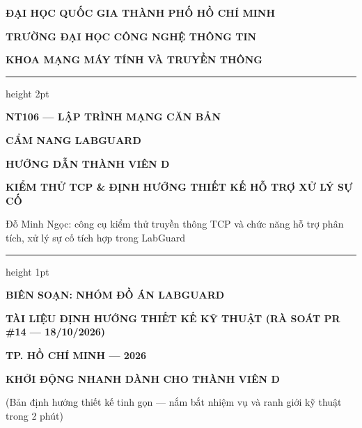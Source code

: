 \documentclass[12pt,a4paper]{article}
\begin{document}
\begin{titlepage}
  \centering
  \vspace*{-10mm}
  {\bfseries\large ĐẠI HỌC QUỐC GIA THÀNH PHỐ HỒ CHÍ MINH\par}
  {\bfseries\large TRƯỜNG ĐẠI HỌC CÔNG NGHỆ THÔNG TIN\par}
  {\bfseries\large KHOA MẠNG MÁY TÍNH VÀ TRUYỀN THÔNG\par}
  \vspace{15mm}
  {\color{lgDeepBlue}\hrule height 2pt}
  \vspace{12mm}
  {\bfseries\large NT106 — LẬP TRÌNH MẠNG CĂN BẢN\par}
  \vspace{12mm}
  {\bfseries\huge\color{lgDeepBlue} CẨM NANG LABGUARD\par}
  \vspace{5mm}
  {\bfseries\Huge\color{lgDeepBlue} HƯỚNG DẪN THÀNH VIÊN D\par}
  \vspace{8mm}
  {\bfseries\Large KIỂM THỬ TCP \& ĐỊNH HƯỚNG THIẾT KẾ HỖ TRỢ XỬ LÝ SỰ CỐ\par}
  \vspace{4mm}
  {\large Đỗ Minh Ngọc: công cụ kiểm thử truyền thông TCP và chức năng hỗ trợ phân tích, xử lý sự cố tích hợp trong LabGuard\par}
  \vspace{12mm}
  {\color{lgTeal}\hrule height 1pt}
  \vspace{25mm}
  {\large\textbf{BIÊN SOẠN: NHÓM ĐỒ ÁN LABGUARD}\par}
  \vspace{6mm}
  {\large\textbf{TÀI LIỆU ĐỊNH HƯỚNG THIẾT KẾ KỸ THUẬT (RÀ SOÁT PR \#14 — 18/10/2026)}\par}
  \vfill
  {\bfseries\color{lgSlate} TP. HỒ CHÍ MINH — 2026\par}
\end{titlepage}

\begingroup\fontsize{10.5}{12.6}\selectfont
\thispagestyle{empty}
\vspace*{-8mm}
{\centering\Large\bfseries\color{lgDeepBlue} KHỞI ĐỘNG NHANH DÀNH CHO THÀNH VIÊN D\par}
\vspace{1mm}
{\centering\footnotesize\color{lgGray} (Bản định hướng thiết kế tinh gọn — nắm bắt nhiệm vụ và ranh giới kỹ thuật trong 2 phút)\par}
\vspace{4mm}
\end{document}
